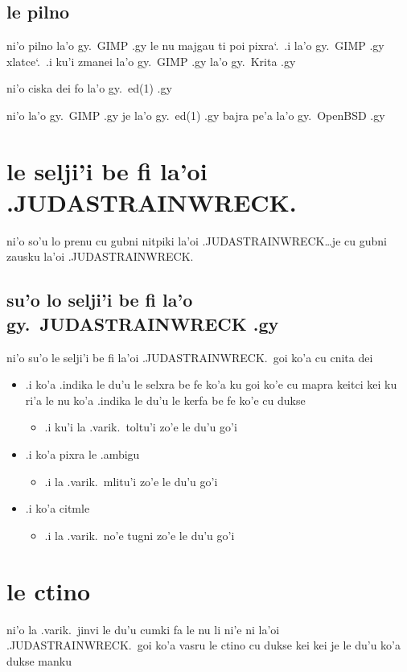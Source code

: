 \documentclass{report}
\newcommand\sds{\spacefactor\sfcode`.\ \space}
\begin{document}
\subsection{le pilno}
ni'o pilno la'o gy.\ GIMP .gy le nu majgau ti poi pixra\sds  .i  la'o gy.\ GIMP .gy xlatce\sds  .i ku'i zmanei la'o gy.\ GIMP .gy la'o gy.\ Krita .gy

ni'o ciska dei fo la'o gy.\ ed(1) .gy

ni'o la'o gy.\ GIMP .gy je la'o gy.\ ed(1) .gy bajra pe'a la'o gy.\ OpenBSD .gy

\section{le selji'i be fi la'oi .JUDASTRAINWRECK.}
ni'o so'u lo prenu cu gubni nitpiki la'oi .JUDASTRAINWRECK\ldots je cu gubni zausku la'oi .JUDASTRAINWRECK.

\subsection{su'o lo selji'i be fi la'o gy.\ JUDASTRAINWRECK .gy}
ni'o su'o le selji'i be fi la'oi .JUDASTRAINWRECK.\ goi ko'a cu cnita dei

\begin{itemize}
	\item .i ko'a .indika le du'u le selxra be fe ko'a ku goi ko'e cu mapra keitci kei ku ri'a le nu ko'a .indika le du'u le kerfa be fe ko'e cu dukse 
	\begin{itemize}
		\item .i ku'i la .varik.\ toltu'i zo'e le du'u go'i
	\end{itemize}
	\item .i ko'a pixra le .ambigu
	\begin{itemize}
		\item .i la .varik.\ mlitu'i zo'e le du'u go'i
	\end{itemize}
	\item .i ko'a citmle
	\begin{itemize}
		\item .i la .varik.\ no'e tugni zo'e le du'u go'i
	\end{itemize}
\end{itemize}
\section{le ctino}
ni'o la .varik.\ jinvi le du'u cumki fa le nu li ni'e ni la'oi .JUDASTRAINWRECK.\ goi ko'a vasru le ctino cu dukse kei kei je le du'u ko'a dukse manku
\end{document}
